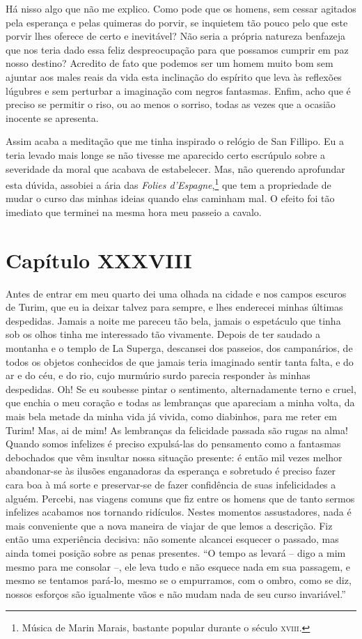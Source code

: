 Há nisso algo que não me explico. Como pode que os homens, sem cessar
agitados pela esperança e pelas quimeras do porvir, se inquietem tão                   
pouco pelo que este porvir lhes oferece de certo e inevitável? Não
seria a própria natureza benfazeja que nos teria dado essa feliz
despreocupação para que possamos cumprir em paz nosso destino? Acredito
de fato que podemos ser um homem muito bom sem ajuntar aos males reais
da vida esta inclinação do espírito que leva às reflexões lúgubres e
sem perturbar a imaginação com negros fantasmas. Enfim, acho que é
preciso se permitir o riso, ou ao menos o sorriso, todas as vezes que a
ocasião inocente se apresenta.

Assim acaba a meditação que me tinha inspirado o relógio de San Fillipo.
Eu a teria levado mais longe se não tivesse me aparecido certo
escrúpulo sobre a severidade da moral que acabava de estabelecer. Mas,
não querendo aprofundar esta dúvida, assobiei a ária das \textit{Folies
d’Espagne},\footnote{ Música de Marin Marais, bastante
popular durante o século \textsc{xviii}.} que tem a propriedade de mudar o
curso das minhas ideias quando elas caminham mal. O efeito foi tão
imediato que terminei na mesma hora meu passeio a cavalo.

\section*{Capítulo XXXVIII}

 Antes de entrar em meu quarto dei uma olhada na cidade e nos campos
escuros de Turim, que eu ia deixar talvez para sempre, e lhes enderecei
minhas últimas despedidas. Jamais a noite me pareceu tão bela, jamais o
espetáculo que tinha sob os olhos tinha me interessado tão vivamente.
Depois de ter saudado a montanha e o templo de La Superga, descansei
dos passeios, dos campanários, de todos os objetos conhecidos de que
jamais teria imaginado sentir tanta falta, e do ar e do céu, e do rio,
cujo murmúrio surdo parecia responder às minhas despedidas. Oh! Se eu
soubesse pintar o sentimento, alternadamente terno e cruel, que enchia
o meu coração e todas as lembranças que apareciam a minha volta, da
mais bela metade da minha vida já vivida, como diabinhos, para me reter
em Turim! Mas, ai de mim! As lembranças da felicidade passada são rugas
na alma! Quando somos infelizes é preciso expulsá-las do pensamento
como a fantasmas debochados que vêm insultar nossa situação presente: é
então mil vezes melhor abandonar-se às ilusões enganadoras da esperança
e sobretudo é preciso fazer cara boa à má sorte e preservar-se de fazer
confidência de suas infelicidades a alguém. Percebi, nas viagens comuns
que fiz entre os homens que de tanto sermos infelizes acabamos nos
tornando ridículos. Nestes momentos assustadores, nada é mais
conveniente que a nova maneira de viajar de que lemos a descrição. Fiz
então uma experiência decisiva: não somente alcancei esquecer o
passado, mas ainda tomei posição sobre as penas presentes. ``O tempo as
levará -- digo a mim mesmo para me consolar --, ele leva tudo e não esquece nada
em sua passagem, e mesmo se tentamos pará-lo, mesmo se o empurramos,
com o ombro, como se diz, nossos esforços são igualmente vãos e não
mudam nada de seu curso invariável.''

